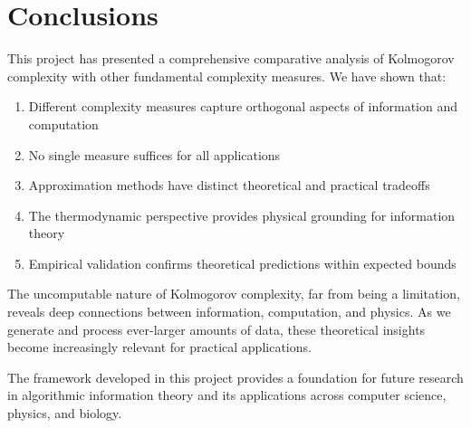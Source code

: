 \documentclass[12pt,a4paper]{report}
\begin{document}
\section{Conclusions}

This project has presented a comprehensive comparative analysis of Kolmogorov complexity with other fundamental complexity measures. We have shown that:

\begin{enumerate}
    \item Different complexity measures capture orthogonal aspects of information and computation
    \item No single measure suffices for all applications
    \item Approximation methods have distinct theoretical and practical tradeoffs
    \item The thermodynamic perspective provides physical grounding for information theory
    \item Empirical validation confirms theoretical predictions within expected bounds
\end{enumerate}

The uncomputable nature of Kolmogorov complexity, far from being a limitation, reveals deep connections between information, computation, and physics. As we generate and process ever-larger amounts of data, these theoretical insights become increasingly relevant for practical applications.

The framework developed in this project provides a foundation for future research in algorithmic information theory and its applications across computer science, physics, and biology.
\end{document}
